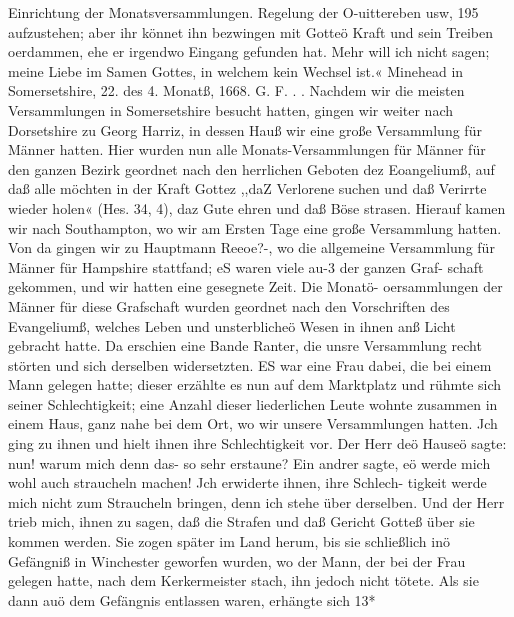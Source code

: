 Einrichtung der Monatsversammlungen. Regelung der O-uittereben usw, 195
aufzustehen; aber ihr könnet ihn bezwingen mit Gotteö Kraft und
sein Treiben oerdammen, ehe er irgendwo Eingang gefunden
hat. Mehr will ich nicht sagen; meine Liebe im Samen Gottes,
in welchem kein Wechsel ist.«
Minehead in Somersetshire, 22. des 4. Monatß, 1668.
G. F. . .
Nachdem wir die meisten Versammlungen in Somersetshire
besucht hatten, gingen wir weiter nach Dorsetshire zu Georg Harriz,
in dessen Hauß wir eine große Versammlung für Männer hatten.
Hier wurden nun alle Monats-Versammlungen für Männer für
den ganzen Bezirk geordnet nach den herrlichen Geboten dez
Eoangeliumß, auf daß alle möchten in der Kraft Gottez ,,daZ
Verlorene suchen und daß Verirrte wieder holen« (Hes. 34, 4),
daz Gute ehren und daß Böse strasen.
Hierauf kamen wir nach Southampton, wo wir am Ersten
Tage eine große Versammlung hatten. Von da gingen wir zu
Hauptmann Reeoe?-, wo die allgemeine Versammlung für Männer
für Hampshire stattfand; eS waren viele au-3 der ganzen Graf-
schaft gekommen, und wir hatten eine gesegnete Zeit. Die Monatö-
oersammlungen der Männer für diese Grafschaft wurden geordnet
nach den Vorschriften des Evangeliumß, welches Leben und
unsterblicheö Wesen in ihnen anß Licht gebracht hatte. Da erschien
eine Bande Ranter, die unsre Versammlung recht störten und
sich derselben widersetzten.
ES war eine Frau dabei, die bei einem Mann gelegen hatte;
dieser erzählte es nun auf dem Marktplatz und rühmte sich
seiner Schlechtigkeit; eine Anzahl dieser liederlichen Leute wohnte
zusammen in einem Haus, ganz nahe bei dem Ort, wo wir unsere
Versammlungen hatten. Jch ging zu ihnen und hielt ihnen ihre
Schlechtigkeit vor. Der Herr deö Hauseö sagte: nun! warum mich
denn das- so sehr erstaune? Ein andrer sagte, eö werde mich
wohl auch straucheln machen! Jch erwiderte ihnen, ihre Schlech-
tigkeit werde mich nicht zum Straucheln bringen, denn ich stehe
über derselben. Und der Herr trieb mich, ihnen zu sagen, daß
die Strafen und daß Gericht Gotteß über sie kommen werden.
Sie zogen später im Land herum, bis sie schließlich inö Gefängniß
in Winchester geworfen wurden, wo der Mann, der bei der Frau
gelegen hatte, nach dem Kerkermeister stach, ihn jedoch nicht tötete.
Als sie dann auö dem Gefängnis entlassen waren, erhängte sich
13*


